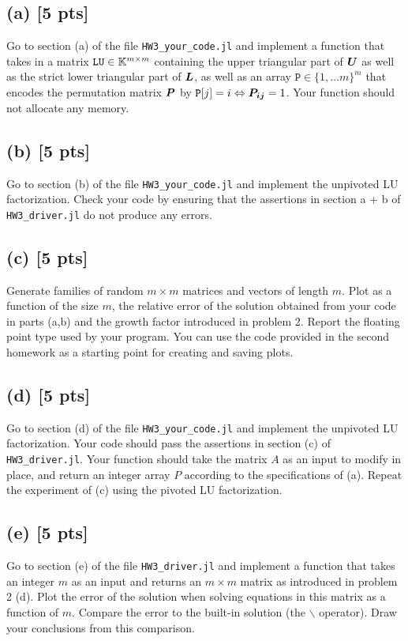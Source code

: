 \documentclass[twoside,10pt]{article}
\begin{document}
\subsection*{(a) [5 pts]} 
Go to section (a) of the file \texttt{HW3\_your\_code.jl} and implement a function that takes in a matrix $\mathtt{LU} \in \mathbb{K}^{m \times m}$ containing the upper triangular part of $\bm{U}$ as well as the strict lower triangular part of $\bm{L}$, as well as an array $\mathtt{P} \in \{1, \ldots m\}^{m}$ that encodes the permutation matrix $\bm{P}$ by $\mathtt{P}[j] = i \Leftrightarrow \bm{P_{ij}} = 1$.
Your function should not allocate any memory. 


\subsection*{(b) [5 pts]} 
Go to section (b) of the file \texttt{HW3\_your\_code.jl} and implement the unpivoted LU factorization. 
Check your code by ensuring that the assertions in section a + b of \texttt{HW3\_driver.jl} do not produce any errors.

\subsection*{(c) [5 pts]}
Generate families of random $m \times m$ matrices and vectors of length $m$. 
Plot as a function of the size $m$, the relative error of the solution obtained from your code in parts (a,b) and the growth factor introduced in problem 2.
Report the floating point type used by your program.
You can use the code provided in the second homework as a starting point for creating and saving plots.

\subsection*{(d) [5 pts]}
Go to section (d) of the file \texttt{HW3\_your\_code.jl} and implement the unpivoted LU factorization. 
Your code should pass the assertions in section (c) of \texttt{HW3\_driver.jl}.
Your function should take the matrix $A$ as an input to modify in place, and return an integer array $P$ according to the specifications of (a).
Repeat the experiment of (c) using the pivoted LU factorization. 


\subsection*{(e) [5 pts]}
Go to section (e) of the file \texttt{HW3\_driver.jl} and implement a function that takes an integer $m$ as an input and returns an $m \times m$ matrix as introduced in problem 2 (d).
Plot the error of the solution when solving equations in this matrix as a function of $m$. 
Compare the error to the built-in solution (the $\backslash$ operator). 
Draw your conclusions from this comparison. 


\end{document}
